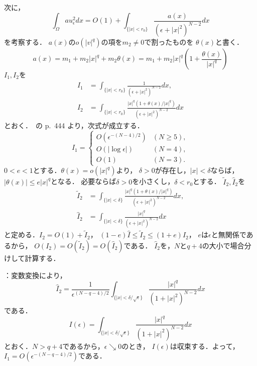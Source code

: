 次に，
\[
 \int_\Omega au_\epsilon^2 dx = O(1) + \int_{ \{ \lvert x \rvert <
 r_0 \} } \frac{a(x)}{(\epsilon +
 \lvert x \rvert^2)^{N-2}} dx 
\]
を考察する．
$a(x)$の$o(\lvert v \rvert^q)$の項を$m_2 \neq 0$で割ったものを
$\theta(x)$と書く．
\[
 a(x) = m_1 + m_2 \lvert x \rvert^q + m_2 \theta(x) 
 = m_1 + m_2 \lvert x \rvert^q \left( 1 + \frac{\theta(x)}{\lvert
 x \rvert^q } \right)
\]
$I_1, I_2$を
\begin{align*}
 I_1 &= 
 \int_{ \{ \lvert x \rvert <
 r_0 \} } \frac{1}{(\epsilon +
 \lvert x \rvert^2)^{N-2}} dx, \\
 I_2 &= 
 \int_{ \{ \lvert x \rvert <
 r_0 \} } \frac{ \lvert x \rvert^q \left( 1 + \theta(x) / \lvert x
 \rvert^q \right)}{(\epsilon +
 \lvert x \rvert^2)^{N-2}} dx
\end{align*}
とおく．\cite{MR709644}~の p.~444 より，次式が成立する．
\[
 I_1 = \begin{cases}
        O(\epsilon^{-(N-4)/2}) & (N \geq 5),\\
        O(\lvert \log \epsilon \rvert) & (N = 4), \\ 
        O(1) & (N = 3).
       \end{cases}
\]
$0 < e < 1$とする．$\theta (x) = o(\lvert x \rvert^q)$より，
$\delta > 0$が存在し，$\lvert x \rvert < \delta$ならば，
$\lvert \theta (x) \rvert \leq e \lvert x \rvert^q$となる．
必要ならば$\delta > 0$を小さくし，$\delta < r_0$とする．
$\tilde{I}_2, \hat{I}_2$を
\begin{align*}
 \tilde{I}_2 &= 
 \int_{ \{ \lvert x \rvert <
 \delta \} } \frac{ \lvert x \rvert^q \left( 1 + \theta(x) / \lvert x
 \rvert^q \right)}{(\epsilon +
 \lvert x \rvert^2)^{N-2}} dx, \\ 
 \hat{I}_2 &= 
 \int_{ \{ \lvert x \rvert <
 \delta \} } \frac{ \lvert x \rvert^q }{(\epsilon +
 \lvert x \rvert^2)^{N-2}} dx
\end{align*}
と定める．$I_2 = O(1) + \tilde{I}_2$，
$(1 - e)\hat{I} \leq \tilde{I}_2 \leq (1 + e)\hat{I}_2$，
$e$は$\epsilon$と無関係であるから，
$O(I_2) = O(\tilde{I}_2) = O(\hat{I}_2)$である．
$\hat{I}_2$を，$N$と$q + 4$の大小で場合分けして計算する．

：変数変換により，
\[
 \hat{I}_2 = \frac{1}{\epsilon^{(N-q - 4)/2}} \int_{ \{ \lvert x
 \rvert < \delta / \sqrt{\epsilon}\}} 
 \frac{ \lvert x \rvert^{q}}{(1 +
 \lvert x \rvert^2)^{N-2}} dx
\]
である．
\[
 I(\epsilon) = \int_{ \{ \lvert x
 \rvert < \delta / \sqrt{\epsilon}\}} 
 \frac{ \lvert x \rvert^{q}}{(1 +
 \lvert x \rvert^2)^{N-2}} dx
\]
とおく．$N > q + 4$であるから，$\epsilon \searrow 0$のとき，
$I(\epsilon)$は収束する．よって，$I_1 =
O(\epsilon^{-(N-q-4)/2})$である．

